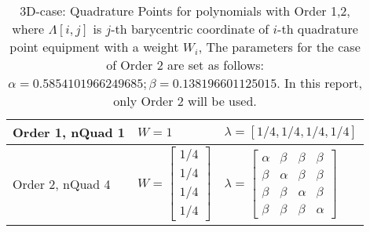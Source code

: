 \begin{table}[ht]
  \centering
  \caption{3D-case: Quadrature Points for polynomials with Order 1,2,
  where $\Lambda[i,j]$ is $j$-th barycentric coordinate of $i$-th quadrature point equipment with a weight $W_i$,
  The parameters for the case of Order 2 are set as follows:$\alpha = 0.5854101966249685; \beta = 0.138196601125015 $.
  In this report, only Order 2 will be used.}
  \label{tab:quadrature-points-3d}
  \begin{tabular}{l|l|l}
    \hline
    Order 1, nQuad 1
    & $W = 1$
    & $\lambda = [1/4, 1/4, 1/4, 1/4]$ \\
    \hline
    Order 2, nQuad 4
    & $W=\left[
      \begin{array}{c}
        1/4 \\
        1/4 \\
        1/4 \\ 
        1/4
      \end{array}\right]$
    &$\lambda=\left[\begin{array}{cccc}
      \alpha & \beta  & \beta  & \beta \\
       \beta  & \alpha & \beta  & \beta \\
       \beta  & \beta  & \alpha & \beta \\
       \beta  & \beta  & \beta  & \alpha 
    \end{array}\right]$ \\
     \hline
  \end{tabular}
\end{table}


